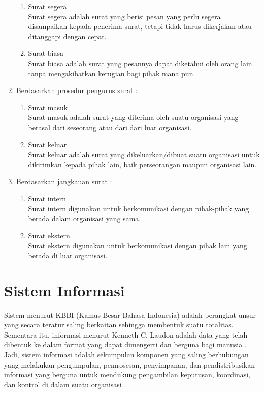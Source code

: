 \begin{enumerate}
\begin{enumerate}
		\item Surat segera \\
		Surat segera adalah surat yang berisi pesan yang perlu segera disampaikan kepada penerima surat, tetapi tidak harus dikerjakan atau ditanggapi dengan cepat.
		\item Surat biasa \\
		Surat biasa adalah surat yang pesannya dapat diketahui oleh orang lain tanpa mengakibatkan kerugian bagi pihak mana pun. 
	\end{enumerate}
	\item Berdasarkan prosedur pengurus surat :
	\begin{enumerate}
		\item Surat masuk \\
		Surat masuk adalah surat yang diterima oleh suatu organisasi yang berasal dari seseorang atau dari dari luar organisasi.
		\item Surat keluar \\
		Surat keluar adalah surat yang dikeluarkan/dibuat suatu organisasi untuk dikirimkan kepada pihak lain, baik perseorangan maupun organisasi lain.
	\end{enumerate}
	\item Berdasarkan jangkauan surat :
	\begin{enumerate}
		\item Surat intern \\
		Surat intern digunakan untuk berkomunikasi dengan pihak-pihak yang berada dalam organisasi yang sama.
		\item Surat ekstern \\
		Surat ekstern digunakan untuk berkomunikasi dengan pihak lain yang berada di luar organisasi.
	\end{enumerate}
\end{enumerate}

\section{Sistem Informasi}
\label{sec:sistem_informasi}
Sistem menurut KBBI (Kamus Besar Bahasa Indonesia) adalah perangkat unsur yang secara teratur saling berkaitan sehingga membentuk suatu totalitas. Sementara itu, informasi menurut Kenneth C. Laudon adalah data yang telah dibentuk ke dalam format yang dapat dimengerti dan berguna bagi manusia \cite{Laudon:1996}. Jadi, sistem informasi adalah sekumpulan komponen yang saling berhubungan yang melakukan pengumpulan, pemrosesan, penyimpanan, dan pendistribusikan informasi yang berguna untuk mendukung pengambilan keputusan, koordinasi, dan kontrol di dalam suatu organisasi \cite{Laudon:1996}.\

